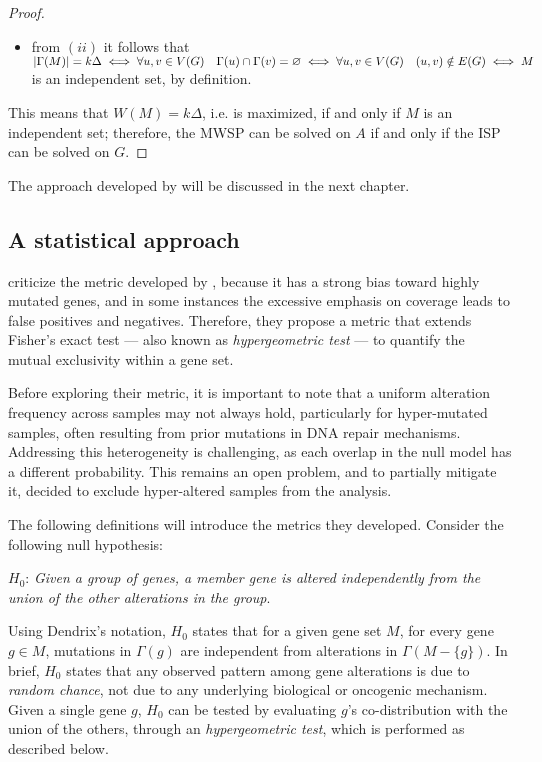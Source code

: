 \begin{proof}
\begin{itemize}
        \item from $(ii)$ it follows that $\left|\Gamma(M)\right| = k \Delta \iff \forall u, v \in V(G) \quad \Gamma(u) \cap \Gamma(v) = \varnothing \iff \forall u, v \in V(G) \quad (u, v) \notin E(G) \iff M$ is an independent set, by definition.
    \end{itemize}

    This means that $W(M) = k \Delta$, i.e. is maximized, if and only if $M$ is an independent set; therefore, the MWSP can be solved on $A$ if and only if the ISP can be solved on $G$.
\end{proof}

The approach developed by \textcite{dendrix} will be discussed in the next chapter.

\subsection{A statistical approach}

\textcite{mutex} criticize the metric developed by \textcite{dendrix}, because it has a strong bias toward highly mutated genes, and in some instances the excessive emphasis on coverage leads to false positives and negatives. Therefore, they propose a metric that extends Fisher's exact test --- also known as \textit{hypergeometric test} --- to quantify the mutual exclusivity within a gene set.

Before exploring their metric, it is important to note that a uniform alteration frequency across samples may not always hold, particularly for hyper-mutated samples, often resulting from prior mutations in DNA repair mechanisms. Addressing this heterogeneity is challenging, as each overlap in the null model has a different probability. This remains an open problem, and to partially mitigate it, \textcite{mutex} decided to exclude hyper-altered samples from the analysis.

The following definitions will introduce the metrics they developed. Consider the following null hypothesis:

\begin{displayquote}
    $H_0$: \textit{Given a group of genes, a member gene is altered independently from the union of the other alterations in the group}.
\end{displayquote}

Using Dendrix's notation, $H_0$ states that for a given gene set $M$, for every gene $g \in M$, mutations in $\Gamma(g)$ are independent from alterations in $\Gamma(M - \{g\})$. In brief, $H_0$ states that any observed pattern among gene alterations is due to \textit{random chance}, not due to any underlying biological or oncogenic mechanism. Given a single gene $g$, $H_0$ can be tested by evaluating $g$'s co-distribution with the union of the others, through an \textit{hypergeometric test}, which is performed as described below.

